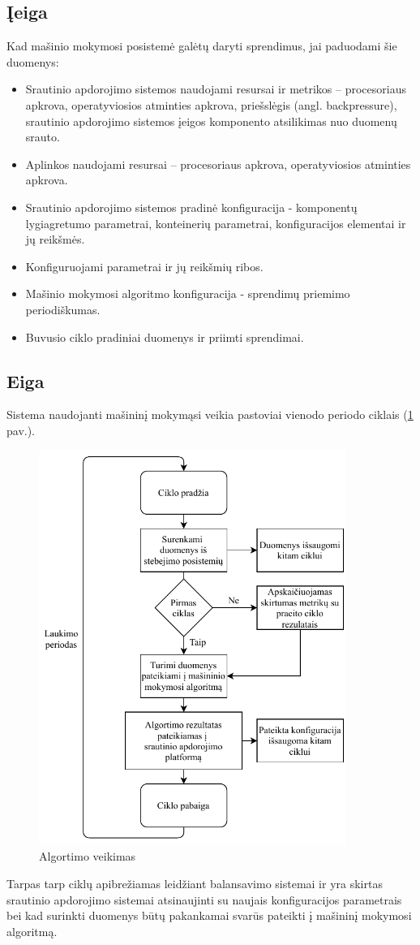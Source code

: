 \documentclass{VUMIFPSbakalaurinis}
\begin{document}
\subsection{Įeiga}
Kad mašinio mokymosi posistemė galėtų daryti sprendimus, jai paduodami šie duomenys:
\begin{itemize}
    \item Srautinio apdorojimo sistemos naudojami resursai ir metrikos – procesoriaus apkrova, operatyviosios atminties apkrova, priešslėgis (angl. backpressure), srautinio apdorojimo sistemos įeigos komponento atsilikimas nuo duomenų srauto.
    \item Aplinkos naudojami resursai – procesoriaus apkrova, operatyviosios atminties apkrova.
    \item Srautinio apdorojimo sistemos pradinė konfiguracija - komponentų lygiagretumo parametrai, konteinerių parametrai, konfiguracijos elementai ir jų reikšmės.
    \item Konfiguruojami parametrai ir jų reikšmių ribos.
    \item Mašinio mokymosi algoritmo konfiguracija - sprendimų priemimo periodiškumas.
    \item Buvusio ciklo pradiniai duomenys ir priimti sprendimai.
\end{itemize}

\subsection{Eiga}

Sistema naudojanti mašininį mokymąsi veikia pastoviai vienodo periodo ciklais (\ref{veikimas} pav.). 
\begin{figure}[H]
    \centering
    \includegraphics[width=10cm]{img/AlgoritmoVeikimas.pdf}
    \caption{Algortimo veikimas}
    \label{veikimas}
\end{figure} 
Tarpas tarp ciklų apibrežiamas leidžiant balansavimo sistemai ir yra skirtas srautinio apdorojimo sistemai atsinaujinti su naujais konfiguracijos parametrais bei kad surinkti duomenys būtų pakankamai svarūs pateikti į mašininį mokymosi algoritmą.
\end{document}

